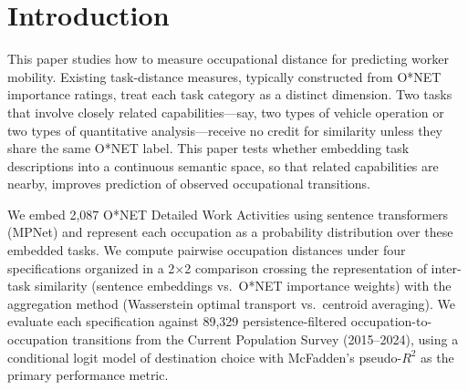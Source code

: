 \documentclass[12pt]{article}
\begin{document}
\section{Introduction}
\label{sec:introduction}


This paper studies how to measure occupational distance for predicting worker mobility. Existing task-distance measures, typically constructed from O*NET importance ratings, treat each task category as a distinct dimension. Two tasks that involve closely related capabilities---say, two types of vehicle operation or two types of quantitative analysis---receive no credit for similarity unless they share the same O*NET label. This paper tests whether embedding task descriptions into a continuous semantic space, so that related capabilities are nearby, improves prediction of observed occupational transitions.

We embed 2,087 O*NET Detailed Work Activities using sentence transformers (MPNet) and represent each occupation as a probability distribution over these embedded tasks. We compute pairwise occupation distances under four specifications organized in a 2$\times$2 comparison crossing the representation of inter-task similarity (sentence embeddings vs.\ O*NET importance weights) with the aggregation method (Wasserstein optimal transport vs.\ centroid averaging). We evaluate each specification against 89,329 persistence-filtered occupation-to-occupation transitions from the Current Population Survey (2015--2024), using a conditional logit model of destination choice with McFadden's pseudo-$R^2$ as the primary performance metric.
\end{document}
